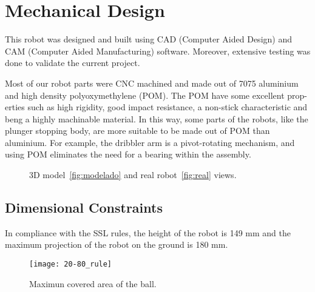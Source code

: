 \section{Mechanical Design}\label{mec_sec}

This robot was designed and built using CAD (Computer Aided Design) and CAM
(Computer Aided Manufacturing) software. Moreover, extensive testing was done
to validate the current project.

Most of our robot parts were CNC machined and made out of 7075 aluminium and
high density polyoxymethylene (POM). The POM have some excellent prop- erties
such as high rigidity, good impact resistance, a non-stick characteristic and
beng a highly machinable material. In this way, some parts of the robots, like
the plunger stopping body, are more suitable to be made out of POM than
aluminium. For example, the dribbler arm is a pivot-rotating mechanism, and
using POM eliminates the need for a bearing within the assembly.


\begin{figure}[ht]
    \label{fig:real_and_model}
    \caption{3D model~\ref{fig:modelado} and real robot~\ref{fig:real} views.}
\end{figure}


\subsection{Dimensional Constraints}
In compliance with the SSL rules, the height of the robot is 149 mm and the
maximum projection of the robot on the ground is 180 mm.

\begin{figure}[ht]
    \centering
    \texttt{[image: 20-80\_rule]}
    \caption{Maximun covered area of the ball.}
    \label{fig:20-80_rule}
\end{figure}

